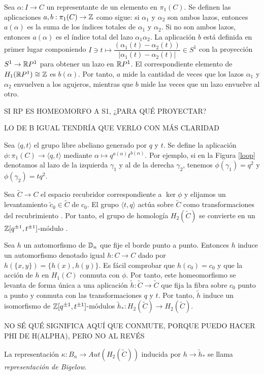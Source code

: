 \documentclass[TFG.tex]{subfiles}
\begin{document}
Sea $\alpha:I\to C$ un representante de un elemento en $\pi_1(C)$. Se definen las aplicaciones $a,b:\pi_1(C)\to\mathbb{Z}$ como sigue: si $\alpha_1$ y $\alpha_2$ son ambos lazos, entonces $a(\alpha)$ es la suma de los índices totales de $\alpha_1$ y $\alpha_2$. Si no son ambos lazos, entonces $a(\alpha)$ es el índice total del lazo $\alpha_1\alpha_2$. La aplicación $b$ está definida en primer lugar componiendo $I\ni t\mapsto \dfrac{(\alpha_1(t)-\alpha_2(t))}{|\alpha_1(t)-\alpha_2(t)|}\in S^1$ con la proyección $S^1\to \mathbb{R} P^1$ para obtener un lazo en $\mathbb{R} P^1$. El correspondiente elemento de $H_1(\mathbb{R} P^1)\cong\mathbb{Z}$ es $b(\alpha)$. Por tanto, $a$ mide la cantidad de veces que los lazos $\alpha_1$ y $\alpha_2$ envuelven a los agujeros, mientras que $b$ mide las veces que un lazo envuelve al otro.

SI RP ES HOMEOMORFO A S1, ¿PARA QUÉ PROYECTAR? 

LO DE B IGUAL TENDRÍA QUE VERLO CON MÁS CLARIDAD

Sea $\langle q,t\rangle$ el grupo libre abeliano  generado por $q$ y $t$. Se define la aplicación $\phi:\pi_1(C)\to\langle q,t\rangle$ mediante $\alpha\mapsto q^{a(\alpha)}t^{b(\alpha)}$. Por ejemplo, si en la Figura \ref{loop} denotamos al lazo de la izquierda $\gamma_1$ y al de la derecha $\gamma_2$, tenemos $\phi(\gamma_1)=q^2$ y $\phi(\gamma_2)=tq^2$. 

Sea $\tilde{C}\to C$ el espacio recubridor correspondiente a $\ker\phi$ y elijamos un levantamiento $\tilde{c}_0\in\tilde{C}$ de $c_0$. El grupo $\langle t,q\rangle$ actúa sobre $\tilde{C}$ como transformaciones del recubrimiento \cite{thesis}. Por tanto, el grupo de homología $H_2(\tilde{C})$ se convierte en un $\mathbb{Z}[q^{\pm 1},t^{\pm 1}]$-módulo \cite{nundam}.

Sea $h$ un automorfismo de $\mathbb{D}_n$ que fije el borde punto a punto. Entonces $h$ induce un automorfismo denotado igual $h:C\to C$ dado por $h(\{x,y\})=\{h(x),h(y)\}$. Es fácil comprobar que $h(c_0)=c_0$ y que la acción de $h$ en $H_1(C)$ conmuta con $\phi$. Por tanto, este homeomorfismo se levanta de forma única a una aplicación $\tilde{h}:\tilde{C}\to\tilde{C}$ que fija la fibra sobre $c_0$ punto a punto y conmuta con las transformaciones $q$ y $t$. Por tanto, $\tilde{h}$ induce un isomorfismo de $\mathbb{Z}[q^{\pm 1},t^{\pm 1}]$-módulos $\tilde{h}_*:H_2(\tilde{C})\to H_2(\tilde{C})$.

NO SÉ QUÉ SIGNIFICA AQUÍ QUE CONMUTE, PORQUE PUEDO HACER PHI DE H(ALPHA), PERO NO AL REVÉS

\begin{defi}
La representación $\kappa:B_n\to Aut(H_2(\tilde{C}))$ inducida por $h\to\tilde{h}_*$ se llama \emph{representación de Bigelow}.
\end{defi}
\end{document}

